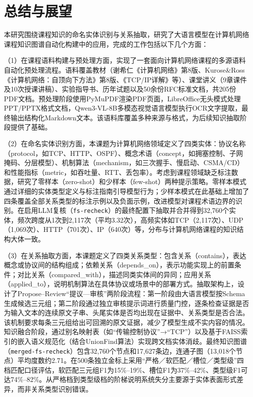 \section{总结与展望}

本研究围绕课程知识的命名实体识别与关系抽取，研究了大语言模型在计算机网络课程知识图谱自动化构建中的应用，完成的工作包括以下几个方面：

（1）在课程语料构建与预处理方面，实现了一套面向计算机网络课程的多源语料自动化预处理流程。语料覆盖教材（谢希仁《计算机网络》第8版\cite{xiexiren2021}、Kurose\&Ross《计算机网络：自顶向下方法》第8版、《TCP/IP详解》等）、课堂讲义（9章课件及10次授课讲稿）、实验指导书、历年试题以及50余份RFC标准文档，共205份PDF文档。预处理阶段使用PyMuPDF渲染PDF页面，LibreOffice无头模式处理PPT/PPTX格式文档，Qwen3-VL-8B多模态视觉语言模型执行OCR文字提取，最终输出结构化Markdown文本。该语料库覆盖多种来源与格式，为后续知识抽取阶段提供了基础。

（2）在命名实体识别方面，本课题为计算机网络领域定义了四类实体：协议名称（protocol，如TCP、HTTP、OSPF）、概念术语（concept，如拥塞控制、子网掩码、分层模型）、机制算法（mechanism，如三次握手、慢启动、CSMA/CD）和性能指标（metric，如吞吐量、RTT、丢包率）。考虑到课程领域缺乏标注数据，研究了零样本（zero-shot）和少样本（few-shot）两种提示策略。零样本模式通过详细的实体类型定义与标注指南引导模型行为；少样本模式在此基础上增加了四条覆盖全部关系类型的标注示例以及负面示例，改进模型对课程术语边界的识别。在启用LLM复核（\texttt{fs-recheck}）的最终配置下抽取并合并得到32,760个实体，频次跨度从1次到2,117次（平均3.32次），高频实体如TCP（2,117次）、UDP（1,069次）、HTTP（701次）、IP（640次）等，分布与计算机网络课程的知识结构大体一致。

（3）在关系抽取方面，本课题定义了四类关系类型：包含关系（contains），表达概念或协议间的结构组成；依赖关系（depends\_on），表示功能实现上的前置条件；对比关系（compared\_with），描述同类实体间的异同；应用关系（applied\_to），说明机制算法在具体协议或场景中的部署方式。抽取架构上，设计了Propose--Review“提议—审核”两阶段流程：第一阶段由大语言模型按Schema生成候选三元组；第二阶段通过独立审核提示词进行质量门控，逐条检查证据是否为输入文本的连续原文子串、头尾实体是否均出现在证据中、关系类型是否合法。该机制要求每条三元组给出可回溯的原文证据，减少了模型生成不实内容的情况。知识融合阶段，通过别名映射表（如“传输控制协议”→“TCP”）以及基于FAISS索引的嵌入语义规范化（结合UnionFind算法）实现跨文档实体消歧。最终知识图谱（\texttt{merged-fs-recheck}）包含32,760个节点和17,627条边，连通子图（13,018个节点）平均度数约2.71。在500条独立金标上采用“严格／软匹配／槽位／类型级”四档匹配口径评估，软匹配三元组F1为15\%--19\%、槽位F1为37\%--42\%、类型级F1可达74\%--82\%。从严格档到类型级档的阶梯说明系统失分主要源于实体表面形式差异，而非关系类型识别错误。

